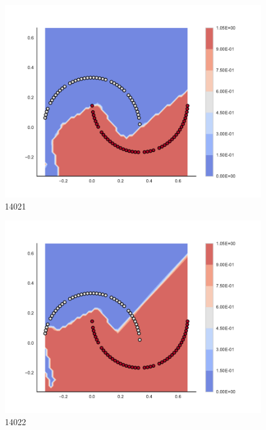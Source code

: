 \begin{subfigure}[b]{0.09\textwidth}
    \includegraphics[clip, trim=2.35cm 1.75cm 4.5cm 0cm,width=\textwidth]{img/convergence/14021.pdf}
    \caption{14021}
    \label{fig:convergence_14021}
\end{subfigure}
%
\begin{subfigure}[b]{0.09\textwidth}
    \includegraphics[clip, trim=2.35cm 1.75cm 4.5cm 0cm,width=\textwidth]{img/convergence/14022.pdf}
    \caption{14022}
    \label{fig:convergence_14022}
\end{subfigure}
%
